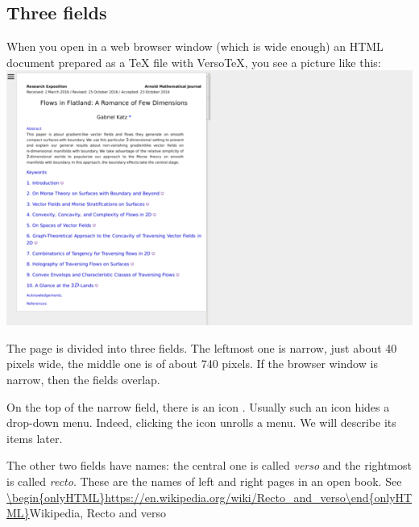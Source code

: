 \documentclass{article}
\begin{document}
\subsection{Three fields}\label{s1.1}
When you open in a web browser window (which is wide enough) 
an HTML document prepared as a TeX file 
with VersoTeX, you see a picture like this:\newline
\includegraphics{figs/page-1.png} 

The page is divided into three fields. The leftmost one  
is narrow, just about 40 pixels wide, the middle one is of about 740
pixels. If the browser window is narrow, then the fields overlap.

On the top of the narrow field, there is an icon
. Usually such an icon hides a drop-down menu. Indeed, 
clicking the icon unrolls a menu.
We will describe its items later.


The other two fields have names: the central one is called {\em verso\/}
and the rightmost is called {\em recto\/}. These are the names of left and
right pages in an open book. See
\url{\begin{onlyHTML}https://en.wikipedia.org/wiki/Recto_and_verso\end{onlyHTML}}{Wikipedia, Recto and
verso} 
\end{document}
